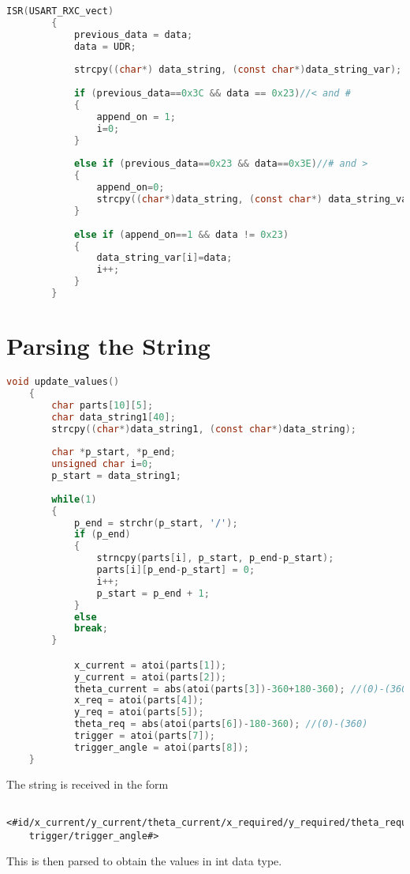 \documentclass[main.tex]{subfiles}
\begin{document}
	\begin{lstlisting}[language=C, caption = Interrupt Service Routine]
		ISR(USART_RXC_vect)
		{		
			previous_data = data;
			data = UDR;
			
			strcpy((char*) data_string, (const char*)data_string_var); //Entire string received!! Save it!!
		
			if (previous_data==0x3C && data == 0x23)//< and #
			{
				append_on = 1;
				i=0;
			}
			
			else if (previous_data==0x23 && data==0x3E)//# and >
			{
				append_on=0;
				strcpy((char*)data_string, (const char*) data_string_var); //Entire string received!! Save it!!
			}
			
			else if (append_on==1 && data != 0x23)
			{
				data_string_var[i]=data;
				i++;
			}
		}
	\end{lstlisting}
	
	\section{Parsing the String}
	
	\begin{lstlisting}[language=C, caption = String Parsing Function]
	void update_values()
	{
		char parts[10][5];
		char data_string1[40];
		strcpy((char*)data_string1, (const char*)data_string);
		
		char *p_start, *p_end;
		unsigned char i=0;
		p_start = data_string1;
		
		while(1) 
		{
			p_end = strchr(p_start, '/');
			if (p_end)
			{
				strncpy(parts[i], p_start, p_end-p_start);
				parts[i][p_end-p_start] = 0;
				i++;
				p_start = p_end + 1;
			}
			else
			break;
		}

			x_current = atoi(parts[1]);
			y_current = atoi(parts[2]);
			theta_current = abs(atoi(parts[3])-360+180-360); //(0)-(360)
			x_req = atoi(parts[4]);
			y_req = atoi(parts[5]);
			theta_req = abs(atoi(parts[6])-180-360); //(0)-(360)
			trigger = atoi(parts[7]);
			trigger_angle = atoi(parts[8]);
	}
	\end{lstlisting}
	
	\pagebreak
	The string is received in the form
	\begin{verbatim}
	<#id/x_current/y_current/theta_current/x_required/y_required/theta_required/
	trigger/trigger_angle#>
	\end{verbatim}
	This is then parsed to obtain the values in int data type.
	
	\pagebreak	
\end{document}
